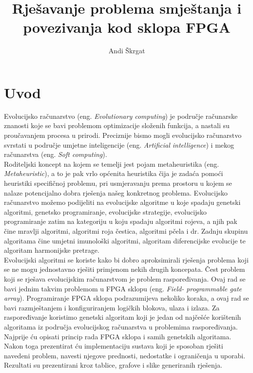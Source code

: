 \documentclass[times, utf8, zavrsni]{fer}
\begin{document}

\title{Rješavanje problema smještanja i povezivanja kod sklopa FPGA}

\author{Andi Škrgat}

\maketitle

\izvornik

\zahvala{}

\tableofcontents

\chapter{Uvod}

Evolucijsko računarstvo (eng. \emph{Evolutionary computing}) je područje računarske znanosti koje se bavi problemom optimizacije složenih funkcija, a nastali su proučavanjem procesa u prirodi. Preciznije bismo mogli evolucijsko računarstvo svrstati u područje umjetne inteligencije (eng. \emph{Artificial intelligence}) i mekog računarstva (eng. \emph{Soft computing}).\\Roditeljski koncept na kojem se temelji jest pojam metaheuristika (eng. \emph{Metaheuristic}), a to je pak vrlo općenita heuristika čija je zadaća pomoći heuristiki specifičnoj problemu, pri usmjeravanju prema prostoru u kojem se nalaze potencijalno dobra rješenja našeg konkretnog problema. Evolucijsko računarstvo možemo podijeliti na evolucijske algoritme u koje spadaju genetski algoritmi, genetsko programiranje, evolucijske strategije, evolucijsko programiranje zatim na kategoriju u koju spadaju algoritmi rojeva, a njih pak čine mravlji algoritmi, algoritmi roja čestica, algoritmi pčela i dr. Zadnju skupinu algoritama čine umjetni imunološki algoritmi, algoritam diferencijske evolucije te algoritam harmonijske pretrage.\\
Evolucijski algoritmi se koriste kako bi dobro aproksimirali rješenja problema koji se ne mogu jednostavno rješiti primjenom nekih drugih koncepata. Čest problem koji se rješava evolucijskim računarstvom je problem raspoređivanja. Ovaj rad se bavi jednim takvim problemom u FPGA sklopu (eng. \emph{Field- programmable gate array}). Programiranje FPGA sklopa podrazumijeva nekoliko koraka, a ovaj rad se bavi razmještanjem i konfiguriranjem logičkih blokova, ulaza i izlaza. Za raspoređivanje koristimo genetski algoritam koji je jedan od najčešće korištenih algoritama iz područja evolucijskog računarstva u problemima raspoređivanja.\\
Najprije ću opisati princip rada FPGA sklopa i samih genetskih algoritama. Nakon toga prezentirat ću implementaciju sustava koji je sposoban rješiti navedeni problem, navesti njegove prednosti, nedostatke i ograničenja u uporabi. Rezultati su prezentirani kroz tablice, grafove i slike generiranih rješenja. 
\end{document}
